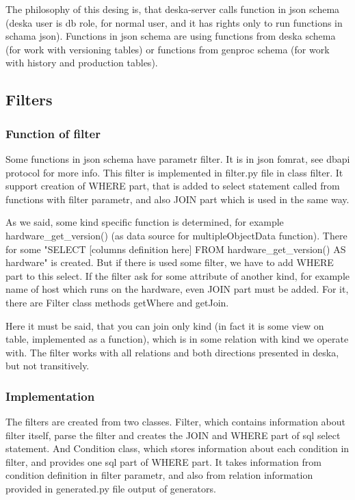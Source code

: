 \documentclass[deska]{subfiles}
\begin{document}
The philosophy of this desing is, that deska-server calls function in json schema (deska user is db role, for normal user, and it has rights only to run functions in schama json). Functions in json schema are using functions from deska schema (for work with versioning tables) or functions from genproc schema (for work with history and production tables).

\subsection{Filters}

\subsubsection{Function of filter}

Some functions in json schema have parametr filter. It is in json fomrat, see dbapi protocol for more info.
This filter is implemented in filter.py file in class filter. It support creation of WHERE part, that is added to select statement called from functions with filter parametr, and also JOIN part which is used in the same way.

As we said, some kind specific function is determined, for example hardware\_get\_version() (as data source for multipleObjectData function). There for some "SELECT [columns definition here] FROM hardware\_get\_version() AS hardware" is created. But if there is used some filter, we have to add WHERE part to this select. If the filter ask for some attribute of another kind, for example name of host which runs on the hardware, even JOIN part must be added. For it, there are Filter class methods getWhere and getJoin. 

Here it must be said, that you can join only kind (in fact it is some view on table, implemented as a function), which is in some relation with kind we operate with. The filter works with all relations and both directions presented in deska, but not transitively.

\subsubsection{Implementation}

The filters are created from two classes. Filter, which contains information about filter itself, parse the filter and creates
the JOIN and WHERE part of sql select statement. And Condition class, which stores information about each condition in filter, and provides
one sql part of WHERE part. It takes information from condition definition in filter parametr, and also from relation information provided
in generated.py file output of generators.
\end{document}
